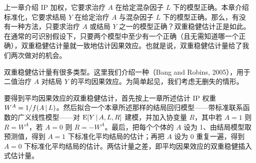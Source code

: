 \renewcommand{\FPname}{精要（Fine Point）}
\begin{finepoint}[双重稳健插入式估计量]
上一章介绍 IP 加权，它要求治疗 $A$ 在给定混杂因子 $L$ 下的模型正确。本章介绍标准化，它要求结局 $Y$ 在给定治疗 $A$ 与混杂因子 $L$ 下的模型正确。那么，有没有一种方法，只要求治疗 $A$ 或结局 $Y$ 之一的模型正确？双重稳健估计正是如此。在通常的可识别假设下，只要两个模型中至少有一个正确（且无需知道哪一个正确），双重稳健估计量就一致地估计因果效应。也就是说，双重稳健估计量给了我们两次做对的机会。

双重稳健估计量有很多类型。这里我们介绍一种（Bang and Robins, 2005），用于二值治疗 $A$ 对结局 $Y$ 的平均因果效应。为简单起见，我们考虑无删失的情形。

要得到平均因果效应的双重稳健估计，首先按上一章所述估计 IP 权重 $W^A=1/f(A\,|\, L)$。然后拟合一个本章所述那样的结局回归模型——带标准联系函数的广义线性模型——对 $\mathrm{E}[Y\,|\, A,L,R]$ 建模，并加入协变量 $R$，其中若 $A=1$ 则 $R=W^A$，若 $A=0$ 则 $R=-W^A$。最后，把每个个体的 $A$ 设为 1、由结局模型取预测值，得到 $A=1$ 下标准化平均结局的估计；再把 $A$ 设为 0 重复一遍，得到 $A=0$ 下标准化平均结局的估计。两估计量之差，即平均因果效应的双重稳健插入式估计量。
\end{finepoint}
\renewcommand{\FPname}{精要}


